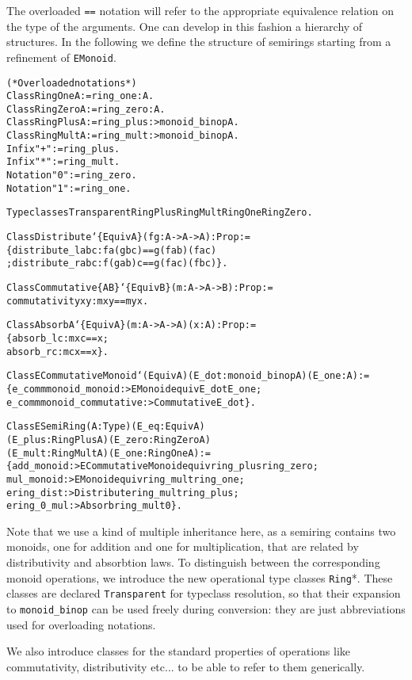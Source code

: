 \documentclass[a4]{report}
\begin{document}
The overloaded \texttt{==} notation will refer to the appropriate
equivalence relation on the type of the arguments. One can develop in
this fashion a hierarchy of structures. In the following we define
the structure of semirings starting from a refinement of \texttt{EMonoid}.

\begin{alltt}
(* Overloaded notations *)
Class RingOne A := ring_one : A.
Class RingZero A := ring_zero : A.
Class RingPlus A := ring_plus :> monoid_binop A.
Class RingMult A := ring_mult :> monoid_binop A.
Infix "+" := ring_plus.
Infix "*" := ring_mult.
Notation "0" := ring_zero.
Notation "1" := ring_one.

Typeclasses Transparent RingPlus RingMult RingOne RingZero.

Class Distribute `\{Equiv A\} (f g: A -> A -> A): Prop :=
  \{ distribute_l a b c: f a (g b c) == g (f a b) (f a c)
  ; distribute_r a b c: f (g a b) c == g (f a c) (f b c) \}.

Class Commutative \{A B\} `\{Equiv B\} (m: A -> A -> B): Prop := 
  commutativity x y : m x y == m y x.

Class Absorb {A} `\{Equiv A\} (m: A -> A -> A) (x : A) : Prop := 
  \{ absorb_l c : m x c == x ;
    absorb_r c : m c x == x \}.

Class ECommutativeMonoid `(Equiv A) (E_dot : monoid_binop A) (E_one : A):=
  \{ e_commmonoid_monoid :> EMonoid equiv E_dot E_one;
    e_commmonoid_commutative :> Commutative E_dot \}.

Class ESemiRing (A:Type) (E_eq :Equiv A) 
  (E_plus : RingPlus A) (E_zero : RingZero A)
  (E_mult : RingMult A) (E_one : RingOne A):=
  \{ add_monoid :> ECommutativeMonoid equiv ring_plus ring_zero ;
    mul_monoid :> EMonoid equiv ring_mult ring_one ;
    ering_dist :> Distribute ring_mult ring_plus ;
    ering_0_mul :> Absorb ring_mult 0 \}.
\end{alltt}

Note that we use a kind of multiple inheritance here, as a semiring contains two
monoids, one for addition and one for multiplication, that are related
by distributivity and absorbtion laws. To distinguish between the
corresponding monoid operations, we introduce the new operational type
classes \texttt{Ring}*. These classes are declared \texttt{Transparent}
for typeclass resolution, so that their expansion to
\texttt{monoid\_binop} can be used freely during conversion: they are
just abbreviations used for overloading notations.

We also introduce classes for the standard properties of operations like
commutativity, distributivity etc... to be able to refer to them generically.
\end{document}
